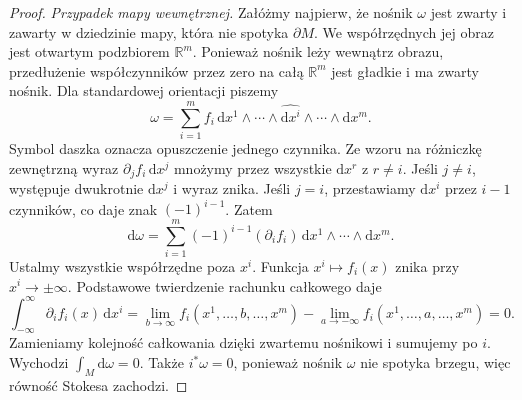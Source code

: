 \documentclass[11pt,a4paper,oneside]{report}
\newcommand{\R}{\mathbb{R}}
\newcommand{\dd}{\mathrm d}
\theoremstyle{plain}
\theoremstyle{definition}
\theoremstyle{remark}
\begin{document}
\begin{proof}
\emph{Przypadek mapy wewnętrznej.}
Załóżmy najpierw, że nośnik $\omega$ jest zwarty
i zawarty w dziedzinie mapy, która nie spotyka
$\partial M$. We współrzędnych jej obraz jest
otwartym podzbiorem $\R^m$. Ponieważ nośnik
leży wewnątrz obrazu, przedłużenie współczynników
przez zero na całą $\R^m$ jest gładkie i ma
zwarty nośnik. Dla standardowej orientacji piszemy
\[
 \omega=\sum_{i=1}^m f_i\,
 \dd x^1\wedge\cdots\wedge\widehat{\dd x^i}
      \wedge\cdots\wedge\dd x^m.
\]
Symbol daszka oznacza opuszczenie jednego czynnika.
Ze wzoru na różniczkę zewnętrzną wyraz
$\partial_j f_i\,\dd x^j$ mnożymy przez wszystkie
$\dd x^r$ z $r\ne i$. Jeśli $j\ne i$, występuje
dwukrotnie $\dd x^j$ i wyraz znika. Jeśli $j=i$,
przestawiamy $\dd x^i$ przez $i-1$ czynników,
co daje znak $(-1)^{i-1}$. Zatem
\[
 \dd\omega=\sum_{i=1}^m(-1)^{i-1}
 (\partial_i f_i)\,\dd x^1\wedge\cdots\wedge\dd x^m.
\]
Ustalmy wszystkie współrzędne poza $x^i$.
Funkcja $x^i\mapsto f_i(x)$ znika przy
$x^i\to\pm\infty$. Podstawowe twierdzenie
rachunku całkowego daje
\[
 \int_{-\infty}^{\infty}\partial_i f_i(x)\,\dd x^i
 =\lim_{b\to\infty}f_i(x^1,\ldots,b,\ldots,x^m)
  -\lim_{a\to-\infty}f_i(x^1,\ldots,a,\ldots,x^m)=0.
\]
Zamieniamy kolejność całkowania dzięki zwartemu
nośnikowi i sumujemy po $i$. Wychodzi
$\int_M\dd\omega=0$. Także
$i^*\omega=0$, ponieważ nośnik $\omega$ nie
spotyka brzegu, więc równość Stokesa zachodzi.


\end{proof}
\end{document}

